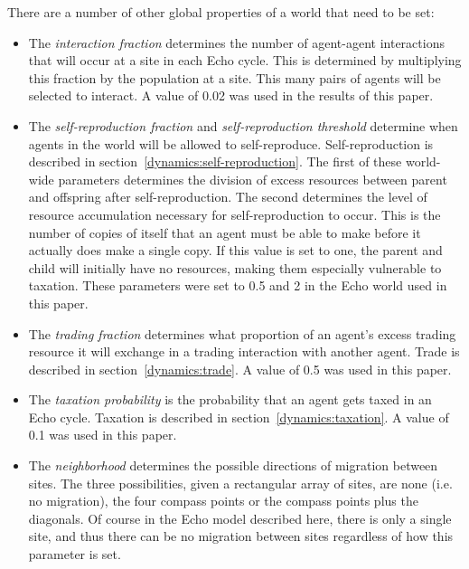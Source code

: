 There are a number of other global properties of a world that need to
be set:

\begin{itemize}
\item
The {\em interaction fraction\/} determines the number of agent-agent
interactions that will occur at a site in each Echo cycle. This is
determined by multiplying this fraction by the population at a
site. This many pairs of agents will be selected to interact. A value
of 0.02 was used in the results of this paper.

\item
The {\em self-reproduction fraction\/} and {\em self-reproduction
threshold\/} determine when agents in the world will be allowed to
self-reproduce. Self-reproduction is described in
section~\ref{dynamics:self-reproduction}. The first of these
world-wide parameters determines the division of excess resources
between parent and offspring after self-reproduction. The second
determines the level of resource accumulation necessary for
self-reproduction to occur. This is the number of copies of itself
that an agent must be able to make before it actually does make a
single copy. If this value is set to one, the parent and child will
initially have no resources, making them especially vulnerable to
taxation. These parameters were set to 0.5 and 2 in the Echo world
used in this paper.

\item
The {\em trading fraction\/} determines what proportion of an agent's
excess trading resource it will exchange in a trading interaction with
another agent. Trade is described in section~\ref{dynamics:trade}. A
value of 0.5 was used in this paper.

\item
The {\em taxation probability\/} is the probability that an agent gets
taxed in an Echo cycle. Taxation is described in
section~\ref{dynamics:taxation}. A value of 0.1 was used in this paper.

\item
The {\em neighborhood\/} determines the possible directions of
migration between sites. The three possibilities, given a rectangular
array of sites, are none (i.e. no migration), the four compass points
or the compass points plus the diagonals. Of course in the Echo model
described here, there is only a single site, and thus there can be no
migration between sites regardless of how this parameter is set.
\end{itemize}

